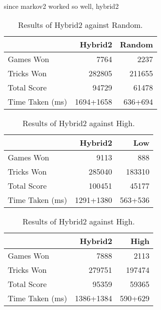 since markov2 worked so well, hybrid2

\begin{table}[ht]
    \centering
    \begin{tabular}{l|rr}
        ~               &  Hybrid2 &   Random  \\  \hline
        Games Won       &   7764        &   2237   \\
        Tricks Won      &   282805      &   211655 \\
        Total Score     &   94729      &   61478  \\
        Time Taken (ms) &   1694+1658   &   636+694
    \end{tabular}
    \caption{Results of Hybrid2 against Random.}
    \label{tab:hybrid2_random}
\end{table}

\clearpage
\begin{table}[ht]
    \begin{minipage}{.5\linewidth}
        \centering
        \begin{tabular}{l|rr}
            ~               &  Hybrid2 &   Low  \\  \hline
            Games Won       &   9113        &   888   \\
            Tricks Won      &   285040      &   183310 \\
            Total Score     &   100451      &   45177  \\
            Time Taken (ms) &   1291+1380   &   563+536
        \end{tabular}
        \caption{Results of Hybrid2 against Low.}
        \label{tab:hybrid2_low}
    \end{minipage}%
    \begin{minipage}{.5\linewidth}
        \centering
        \begin{tabular}{l|rr}
            ~               &  Hybrid2 &   High  \\  \hline
            Games Won       &   7888        &   2113   \\
            Tricks Won      &   279751      &   197474 \\
            Total Score     &   95359      &   59365  \\
            Time Taken (ms) &   1386+1384   &   590+629
        \end{tabular}
        \caption{Results of Hybrid2 against High.}
        \label{tab:hybrid2_high}
    \end{minipage} 
\end{table}



